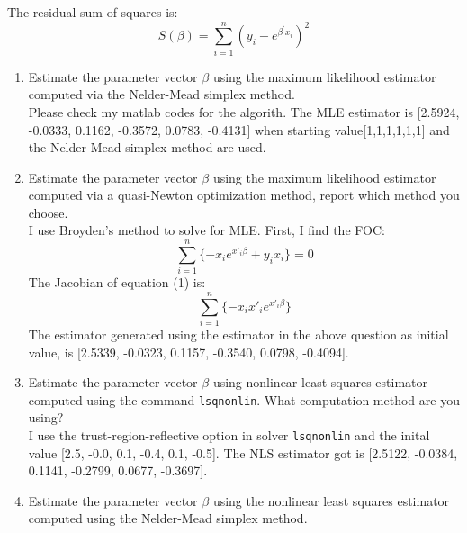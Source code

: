 \documentclass{article}
\begin{document}
The residual sum of squares is:%
\[
S\left( \beta \right) =\sum\limits_{i=1}^{n}\left( y_{i}-e^{\beta ^{\prime
}x_{i}}\right) ^{2} 
\]

\begin{enumerate}
\item Estimate the parameter vector $\beta$ using the maximum likelihood estimator computed via  
the Nelder-Mead simplex method. \\[2em]

Please check my matlab codes for the algorith. The MLE estimator is [2.5924, -0.0333, 0.1162, -0.3572, 0.0783, -0.4131] when starting value[1,1,1,1,1,1] and the Nelder-Mead simplex method are used. \\[3em]






\item Estimate the parameter vector $\beta$ using the maximum likelihood estimator computed via  
a quasi-Newton optimization method, report which method you choose.\\[2em]

I use Broyden's method to solve for MLE. First, I find the FOC: 
\begin{equation}
\sum_{i=1}^n  \lbrace -x_i e^{x'_i\beta}+y_i x_i \rbrace=0
\end{equation}
The Jacobian of equation (1) is: $$\sum_{i=1}^n  \lbrace -x_i x'_ie^{x'_i\beta} \rbrace $$
The estimator generated using the estimator in the above question as initial value, is [2.5339, -0.0323, 0.1157, -0.3540, 0.0798, -0.4094].    \\[3em]


 

\item Estimate the parameter vector $\beta$ using nonlinear least squares estimator computed using
the command {\tt lsqnonlin}. What computation method are you using? \\[2em]

I use the trust-region-reflective option in solver {\tt lsqnonlin} and the inital value [2.5, -0.0, 0.1, -0.4, 0.1, -0.5]. The NLS estimator got is [2.5122, -0.0384, 0.1141, -0.2799,  0.0677, -0.3697]. \\[3em]


\item Estimate the parameter vector $\beta$ using the nonlinear least squares estimator computed using 
the Nelder-Mead simplex method. \\[2em]


\end{enumerate}
\end{document}
